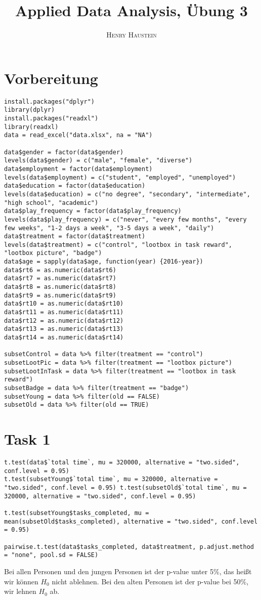 \documentclass{article}
\title{\textbf{Applied Data Analysis, Übung 3}}
\author{\textsc{Henry Haustein}}
\date{}
\begin{document}
	\maketitle
	
	\section*{Vorbereitung}
	\begin{lstlisting}
install.packages("dplyr")
library(dplyr)
install.packages("readxl")
library(readxl)
data = read_excel("data.xlsx", na = "NA")

data$gender = factor(data$gender)
levels(data$gender) = c("male", "female", "diverse")
data$employment = factor(data$employment)
levels(data$employment) = c("student", "employed", "unemployed")
data$education = factor(data$education)
levels(data$education) = c("no degree", "secondary", "intermediate", "high school", "academic")
data$play_frequency = factor(data$play_frequency)
levels(data$play_frequency) = c("never", "every few months", "every few weeks", "1-2 days a week", "3-5 days a week", "daily")
data$treatment = factor(data$treatment)
levels(data$treatment) = c("control", "lootbox in task reward", "lootbox picture", "badge")
data$age = sapply(data$age, function(year) {2016-year})
data$rt6 = as.numeric(data$rt6)
data$rt7 = as.numeric(data$rt7)
data$rt8 = as.numeric(data$rt8)
data$rt9 = as.numeric(data$rt9)
data$rt10 = as.numeric(data$rt10)
data$rt11 = as.numeric(data$rt11)
data$rt12 = as.numeric(data$rt12)
data$rt13 = as.numeric(data$rt13)
data$rt14 = as.numeric(data$rt14)

subsetControl = data %>% filter(treatment == "control")
subsetLootPic = data %>% filter(treatment == "lootbox picture")
subsetLootInTask = data %>% filter(treatment == "lootbox in task reward")
subsetBadge = data %>% filter(treatment == "badge")
subsetYoung = data %>% filter(old == FALSE)
subsetOld = data %>% filter(old == TRUE)
	\end{lstlisting}
	
	\section*{Task 1}
	\begin{lstlisting}
t.test(data$`total time`, mu = 320000, alternative = "two.sided", conf.level = 0.95)
t.test(subsetYoung$`total time`, mu = 320000, alternative = "two.sided", conf.level = 0.95)	t.test(subsetOld$`total time`, mu = 320000, alternative = "two.sided", conf.level = 0.95)
	
t.test(subsetYoung$tasks_completed, mu = mean(subsetOld$tasks_completed), alternative = "two.sided", conf.level = 0.95)
	
pairwise.t.test(data$tasks_completed, data$treatment, p.adjust.method = "none", pool.sd = FALSE)
	\end{lstlisting}
	Bei allen Personen und den jungen Personen ist der p-value unter 5\%, das heißt wir können $H_0$ nicht ablehnen. Bei den alten Personen ist der p-value bei 50\%, wir lehnen $H_0$ ab.
\end{document}
